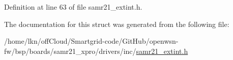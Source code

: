 Definition at line 63 of file samr21\+\_\+extint.\+h.



The documentation for this struct was generated from the following file\+:\begin{DoxyCompactItemize}
\item 
/home/lkn/off\+Cloud/\+Smartgrid-\/code/\+Git\+Hub/openwsn-\/fw/bsp/boards/samr21\+\_\+xpro/drivers/inc/\hyperlink{samr21__extint_8h}{samr21\+\_\+extint.\+h}\end{DoxyCompactItemize}
